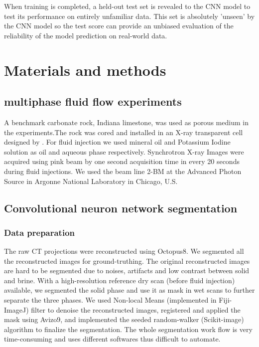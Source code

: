\documentclass[draft,linenumbers]{agujournal2018}
\begin{document}
When training is completed, a held-out test set is revealed to the CNN model to test its performance on entirely unfamiliar data. This set is absolutely 'unseen' by the CNN model so the test score can provide an unbiased evaluation of the reliability of the model prediction on real-world data.

\section{Materials and methods}
\subsection{multiphase fluid flow experiments}
A benchmark carbonate rock, Indiana limestone, was used as porous medium in the experiments.The rock was cored and installed in an X-ray transparent cell designed by \citet{fusseis2014low}. For fluid injection we used mineral oil and Potassium Iodine solution as oil and aqueous phase respectively. Synchrotron X-ray Images were acquired using pink beam by one second acquisition time in every 20 seconds during fluid injections. We used the beam line 2-BM at the Advanced Photon Source in Argonne National Laboratory in Chicago, U.S.

\subsection{Convolutional neuron network segmentation}
\subsubsection{Data preparation}
The raw CT projections were reconstructed using Octopus8\texttrademark. We segmented all the reconstructed images for ground-truthing. The original reconstructed images are hard to be segmented due to noises, artifacts and low contrast between solid and brine. With a high-resolution reference dry scan (before fluid injection) available, we segmented the solid phase and use it as mask in wet scans to further separate the three phases. We used Non-local Means (implemented in Fiji-ImageJ) filter to denoise the reconstructed images, registered and applied the mask using Avizo9\texttrademark, and implemented the seeded random-walker (Scikit-image) algorithm to finalize the segmentation. The whole segmentation work flow is very time-consuming and uses different softwares thus difficult to automate.
\end{document}
